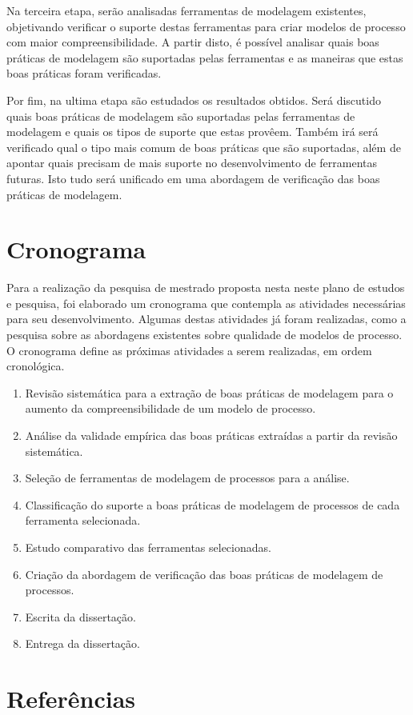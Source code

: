 \documentclass[12pt]{article}
\begin{document}
Na terceira etapa, serão analisadas ferramentas de modelagem existentes, objetivando verificar o suporte destas ferramentas para criar modelos de processo com maior compreensibilidade. A partir disto, é possível analisar quais boas práticas de modelagem são suportadas pelas ferramentas e as maneiras que estas boas práticas foram verificadas.

Por fim, na ultima etapa são estudados os resultados obtidos. Será discutido quais boas práticas de modelagem são suportadas pelas ferramentas de modelagem e quais os tipos de suporte que estas provêem. Também irá será verificado qual o tipo mais comum de boas práticas que são suportadas, além de apontar quais precisam de mais suporte no desenvolvimento de ferramentas futuras. Isto tudo será unificado em uma abordagem de verificação das boas práticas de modelagem.


\section{Cronograma}

Para a realização da pesquisa de mestrado proposta nesta neste plano de estudos e pesquisa, foi elaborado um cronograma que contempla as atividades necessárias para seu desenvolvimento. Algumas destas atividades já foram realizadas, como a pesquisa sobre as abordagens existentes sobre qualidade de modelos de processo. O cronograma define as próximas atividades a serem realizadas, em ordem cronológica.

\begin{enumerate}
	\item Revisão sistemática para a extração de boas práticas de modelagem para o aumento da compreensibilidade de um modelo de processo.
	\item Análise da validade empírica das boas práticas extraídas a partir da revisão sistemática.
	\item Seleção de ferramentas de modelagem de processos para a análise.
	\item Classificação do suporte a boas práticas de modelagem de processos de cada ferramenta selecionada.
	\item Estudo comparativo das ferramentas selecionadas.
	\item Criação da abordagem de verificação das boas práticas de modelagem de processos.
	\item Escrita da dissertação.
	\item Entrega da dissertação.
\end{enumerate}

\newpage
\section{Referências}


\end{document}
